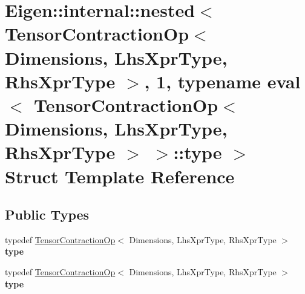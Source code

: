 \hypertarget{struct_eigen_1_1internal_1_1nested_3_01_tensor_contraction_op_3_01_dimensions_00_01_lhs_xpr_type916b0c22d0dc73d7838ae3849789214b}{}\section{Eigen\+:\+:internal\+:\+:nested$<$ Tensor\+Contraction\+Op$<$ Dimensions, Lhs\+Xpr\+Type, Rhs\+Xpr\+Type $>$, 1, typename eval$<$ Tensor\+Contraction\+Op$<$ Dimensions, Lhs\+Xpr\+Type, Rhs\+Xpr\+Type $>$ $>$\+:\+:type $>$ Struct Template Reference}
\label{struct_eigen_1_1internal_1_1nested_3_01_tensor_contraction_op_3_01_dimensions_00_01_lhs_xpr_type916b0c22d0dc73d7838ae3849789214b}
\subsection*{Public Types}
\begin{DoxyCompactItemize}
\item 
\mbox{\label{struct_eigen_1_1internal_1_1nested_3_01_tensor_contraction_op_3_01_dimensions_00_01_lhs_xpr_type916b0c22d0dc73d7838ae3849789214b_a2c03d0476b069159dbd326258fb6ca4a}} 
typedef \hyperlink{class_eigen_1_1_tensor_contraction_op}{Tensor\+Contraction\+Op}$<$ Dimensions, Lhs\+Xpr\+Type, Rhs\+Xpr\+Type $>$ {\bfseries type}
\item 
\mbox{\label{struct_eigen_1_1internal_1_1nested_3_01_tensor_contraction_op_3_01_dimensions_00_01_lhs_xpr_type916b0c22d0dc73d7838ae3849789214b_a2c03d0476b069159dbd326258fb6ca4a}} 
typedef \hyperlink{class_eigen_1_1_tensor_contraction_op}{Tensor\+Contraction\+Op}$<$ Dimensions, Lhs\+Xpr\+Type, Rhs\+Xpr\+Type $>$ {\bfseries type}
\end{DoxyCompactItemize}



